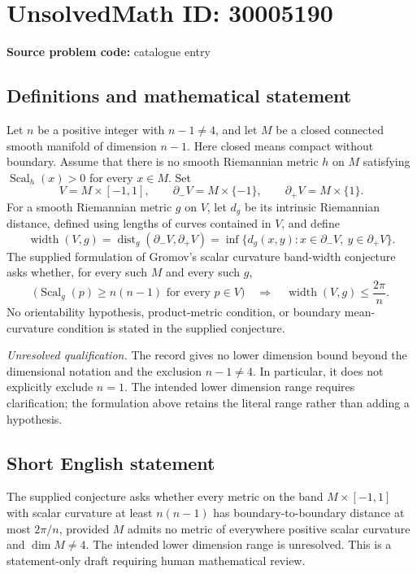 \documentclass[11pt]{article}
\begin{document}
\section*{UnsolvedMath ID: 30005190}
\textbf{Source problem code:} catalogue entry
\subsection{Definitions and mathematical statement}
Let \(n\) be a positive integer with \(n-1\neq 4\), and let \(M\) be a closed connected smooth manifold of dimension \(n-1\). Here closed means compact without boundary. Assume that there is no smooth Riemannian metric \(h\) on \(M\) satisfying \(\operatorname{Scal}_h(x)>0\) for every \(x\in M\). Set
\[
V=M\times[-1,1],\qquad \partial_-V=M\times\{-1\},\qquad \partial_+V=M\times\{1\}.
\]
For a smooth Riemannian metric \(g\) on \(V\), let \(d_g\) be its intrinsic Riemannian distance, defined using lengths of curves contained in \(V\), and define
\[
\operatorname{width}(V,g)=\operatorname{dist}_g(\partial_-V,\partial_+V)
=\inf\{d_g(x,y):x\in\partial_-V,\ y\in\partial_+V\}.
\]
The supplied formulation of Gromov's scalar curvature band-width conjecture asks whether, for every such \(M\) and every such \(g\),
\[
\bigl(\operatorname{Scal}_g(p)\geq n(n-1)\text{ for every }p\in V\bigr)
\quad\Longrightarrow\quad
\operatorname{width}(V,g)\leq\frac{2\pi}{n}.
\]
No orientability hypothesis, product-metric condition, or boundary mean-curvature condition is stated in the supplied conjecture.

\textit{Unresolved qualification.} The record gives no lower dimension bound beyond the dimensional notation and the exclusion \(n-1\neq4\). In particular, it does not explicitly exclude \(n=1\). The intended lower dimension range requires clarification; the formulation above retains the literal range rather than adding a hypothesis.
\subsection{Short English statement}
The supplied conjecture asks whether every metric on the band \(M\times[-1,1]\) with scalar curvature at least \(n(n-1)\) has boundary-to-boundary distance at most \(2\pi/n\), provided \(M\) admits no metric of everywhere positive scalar curvature and \(\dim M\neq4\). The intended lower dimension range is unresolved. This is a statement-only draft requiring human mathematical review.
\end{document}
